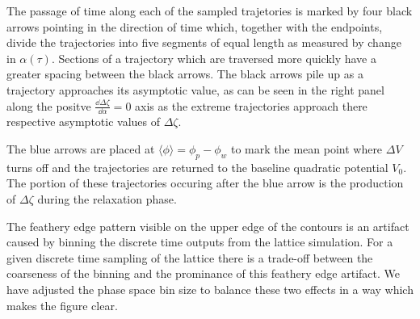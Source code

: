 {\begin{figure*}
{    %
    The passage of time along each of the sampled trajetories is marked by four black arrows pointing in the direction of time which, together with the endpoints, divide the trajectories into five segments of equal length as measured by change in $\alpha(\tau)$. Sections of a trajectory which are traversed more quickly have a greater spacing between the black arrows.
    The black arrows pile up as a trajectory approaches its asymptotic value, as can be seen in the right panel along the positve $\frac{\dd\Delta\zeta}{\dd\alpha}=0$ axis as the extreme trajectories approach there respective asymptotic values of $\Delta\zeta$.
    
    The blue arrows are placed at $\langle\phi\rangle = \phi_p - \phi_w$ to mark the mean point where $\Delta V$ turns off and the trajectories are returned to the baseline quadratic potential $V_0$. The portion of these trajectories occuring after the blue arrow is the production of $\Delta\zeta$ during the relaxation phase.

    The feathery edge pattern visible on the upper edge of the contours is an artifact caused by binning the discrete time outputs from the lattice simulation. For a given discrete time sampling of the lattice there is a trade-off between the coarseness of the binning and the prominance of this feathery edge artifact. We have adjusted the phase space bin size to balance these two effects in a way which makes the figure clear.    
    }
    \label{fig:zetapstraj}
  \end{figure*}
}
